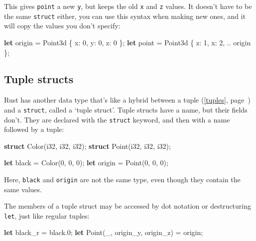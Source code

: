 \documentclass[a4paper,]{book}
\renewcommand*{\hyperlink}[2]{%
 #2 (\autoref{#1}, page~\pageref{#1})}
\newenvironment{Shaded}{\begin{snugshade}}{\end{snugshade}}
\newcommand{\KeywordTok}[1]{\textcolor[rgb]{0.13,0.29,0.53}{\textbf{{#1}}}}
\newcommand{\DataTypeTok}[1]{\textcolor[rgb]{0.13,0.29,0.53}{{#1}}}
\newcommand{\DecValTok}[1]{\textcolor[rgb]{0.00,0.00,0.81}{{#1}}}
\newcommand{\NormalTok}[1]{{#1}}
\begin{document}
This gives \texttt{point} a new \texttt{y}, but keeps the old \texttt{x}
and \texttt{z} values. It doesn't have to be the same \texttt{struct}
either, you can use this syntax when making new ones, and it will copy
the values you don't specify:

\begin{Shaded}
\begin{Highlighting}[]
\KeywordTok{let} \NormalTok{origin = Point3d \{ x: }\DecValTok{0}\NormalTok{, y: }\DecValTok{0}\NormalTok{, z: }\DecValTok{0} \NormalTok{\};}
\KeywordTok{let} \NormalTok{point = Point3d \{ z: }\DecValTok{1}\NormalTok{, x: }\DecValTok{2}\NormalTok{, .. origin \};}
\end{Highlighting}
\end{Shaded}

\subsection{Tuple structs}\label{tuple-structs}

Rust has another data type that's like a hybrid between a
\protect\hyperlink{tuples}{tuple} and a \texttt{struct}, called a `tuple
struct'. Tuple structs have a name, but their fields don't. They are
declared with the \texttt{struct} keyword, and then with a name followed
by a tuple:

\begin{Shaded}
\begin{Highlighting}[]
\KeywordTok{struct} \NormalTok{Color(}\DataTypeTok{i32}\NormalTok{, }\DataTypeTok{i32}\NormalTok{, }\DataTypeTok{i32}\NormalTok{);}
\KeywordTok{struct} \NormalTok{Point(}\DataTypeTok{i32}\NormalTok{, }\DataTypeTok{i32}\NormalTok{, }\DataTypeTok{i32}\NormalTok{);}

\KeywordTok{let} \NormalTok{black = Color(}\DecValTok{0}\NormalTok{, }\DecValTok{0}\NormalTok{, }\DecValTok{0}\NormalTok{);}
\KeywordTok{let} \NormalTok{origin = Point(}\DecValTok{0}\NormalTok{, }\DecValTok{0}\NormalTok{, }\DecValTok{0}\NormalTok{);}
\end{Highlighting}
\end{Shaded}

Here, \texttt{black} and \texttt{origin} are not the same type, even
though they contain the same values.

The members of a tuple struct may be accessed by dot notation or
destructuring \texttt{let}, just like regular tuples:

\begin{Shaded}
\begin{Highlighting}[]
\KeywordTok{let} \NormalTok{black_r = black.}\DecValTok{0}\NormalTok{;}
\KeywordTok{let} \NormalTok{Point(_, origin_y, origin_z) = origin;}
\end{Highlighting}
\end{Shaded}
\end{document}
